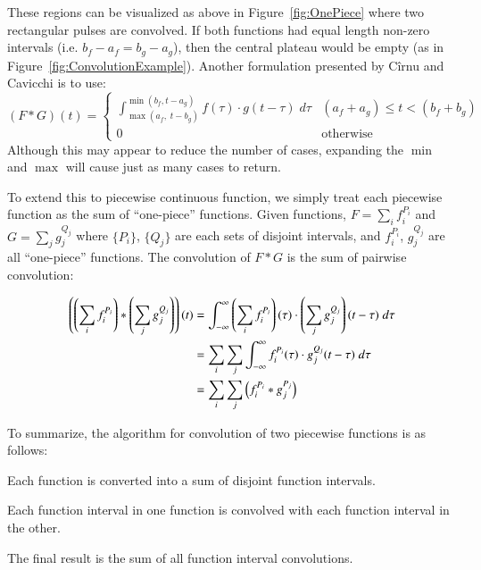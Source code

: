 These regions can be visualized as above in Figure~\ref{fig:OnePiece} where two rectangular pulses are convolved. 
If both functions had equal length non-zero intervals (i.e. $b_f-a_f = b_g-a_g$), then the central plateau would be empty
(as in Figure~\ref{fig:ConvolutionExample}).
Another formulation presented by C\^{i}rnu \cite{cirnu2012calculation} and Cavicchi \cite{cavicchi2002simplified} is to use:
\begin{equation}
	\label{eqn:ConvCirnu}
	(F*G)(t)=
	\begin{cases}
		\int_{\max(a_f, \; t-b_g)}^{\min(b_f, t-a_g)} f(\tau)\cdot g(t-\tau)\; d\tau & (a_f+a_g) \leq t < (b_f+b_g) \\
		0 & \text{otherwise}
	\end{cases}
\end{equation}
Although this may appear to reduce the number of cases, expanding the $\min$ and $\max$ will cause just as many 
cases to return.


To extend this to piecewise continuous function, 
we simply treat each piecewise function as the sum of ``one-piece'' functions.
Given functions, $F= \sum_i f_i^{P_i}$ and $G= \sum_j g_j^{Q_j}$ 
where $\{P_i\}$, $\{Q_j\}$ are each sets of disjoint intervals, and $f_i^{P_i}$, $g_j^{Q_j}$ are all ``one-piece'' functions.
The convolution of $F*G$ is the sum of pairwise convolution:

\begin{align}
	\label{eqn:ConvPiecewise}
	\left(\left(\sum_i f_i^{P_i}\right) * \left(\sum_j g_j^{Q_j}\right)\right) (t)
	&= \int_{-\infty}^\infty \left(\sum_i f_i^{P_i}\right)(\tau)\cdot \left(\sum_j g_j^{Q_j}\right)(t-\tau) \;d\tau
	\notag\\&= \sum_i \sum_j \int_{-\infty}^\infty f_i^{P_i}(\tau) \cdot g_j^{Q_j}(t-\tau) \;d\tau 
	\notag\\&= \sum_i \sum_j \left(f_i^{P_i} * g_j^{P_j}\right)
\end{align}

To summarize, the algorithm for convolution of two piecewise functions is as follows:
\begin{enumerate*}
	\item Each function is converted into a sum of disjoint function intervals.
	\item Each function interval in one function is convolved with each function interval in the other.
	\item The final result is the sum of all function interval convolutions.
\end{enumerate*}

